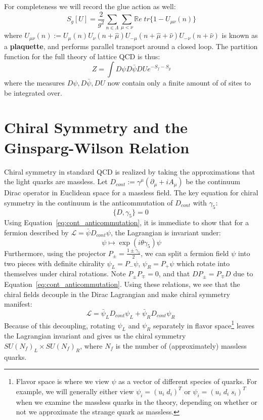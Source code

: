 \documentclass[11pt, oneside]{article}   	%
\theoremstyle{definition}
\begin{document}
For completeness we will record the glue action as well:
\begin{equation}
	S_{g}[U] = \frac{2}{g^2}\sum_{n\in\Lambda}\sum_{\mu < \nu}\mathbb Re\; tr\{1 - U_{\mu\nu}(n)\}
\end{equation}
where $U_{\mu\nu}(n) := U_\mu(n) U_\nu(n + \hat\mu) U_{-\mu}(n + \hat\mu + \hat\nu) U_{-\nu}(n + \hat\nu)$ is known as a 
\textbf{plaquette}, and performs parallel transport around a closed loop. The partition function for the full theory of lattice QCD 
is thus:
\begin{equation}
	Z = \int D\psi D\bar\psi D U e^{-S_f - S_g}
\end{equation}
where the measures $D\psi, D\bar\psi, DU$ now contain only a finite amount of of sites to be integrated over. 

\section{Chiral Symmetry and the Ginsparg-Wilson Relation}

Chiral symmetry in standard QCD is realized by taking the approximations that the light quarks are massless. 
Let $D_{cont} := \gamma^\mu (\partial_\mu + i A_\mu)$ be the continuum Dirac operator in Euclidean space for a massless 
field. The key equation for chiral symmetry in the continuum is the anticommutation of $D_{cont}$ with $\gamma_5$:
\begin{equation}
	\{D, \gamma_5\} = 0~
	\label{eq:cont_anticommutation}
\end{equation}
Using Equation~\ref{eq:cont_anticommutation}, it is immediate to show that for a fermion described by $\mathcal L = 
\bar\psi D_{cont}\psi$, the Lagrangian is invariant under:
\begin{equation}
	\psi\mapsto \exp(i\theta\gamma_5)\psi
\end{equation}
Furthermore, using the projector $P_\pm = \frac{1\pm\gamma_5}{2}$, we can split a fermion field $\psi$ into two pieces with 
definite chirality $\psi_L = P_-\psi$, $\psi_R = P_+\psi$ which rotate into themselves under chiral rotations. Note $P_\pm 
P_\mp = 0$, and that $DP_\pm = P_\mp D$ due to Equation~\ref{eq:cont_anticommutation}. Using these relations, we 
see that the chiral fields decouple in the Dirac Lagrangian and make chiral symmetry manifest:
\begin{equation}
	\mathcal L = \bar\psi_L D_{cont}\psi_L + \bar\psi_R D_{cont}\psi_R~
	\label{eq:cont_chiral_lagrangian}
\end{equation}
Because of this decoupling, rotating $\psi_L$ and $\psi_R$ separately in flavor space\footnote{Flavor space is where we view 
$\psi$ as a vector of different species of quarks. For example, we will generally either view $\psi_i = (u_i\; d_i)^T$ or 
$\psi_i = (u_i\; d_i\; s_i)^T$ when we examine the massless quarks in the theory, depending on whether or not we approximate 
the strange quark as massless.} leaves the Lagrangian invariant and gives us the chiral symmetry $SU(N_f)_L\times 
SU(N_f)_R$, where $N_f$ is the number of (approximately) massless quarks. 
\end{document}
